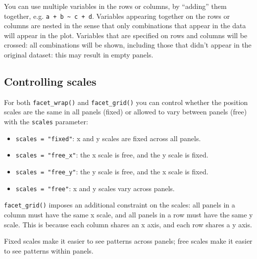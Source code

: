 You can use multiple variables in the rows or columns, by ``adding''
them together, e.g. \texttt{a\ +\ b\ \textasciitilde{}\ c\ +\ d}.
Variables appearing together on the rows or columns are nested in the
sense that only combinations that appear in the data will appear in the
plot. Variables that are specified on rows and columns will be crossed:
all combinations will be shown, including those that didn't appear in
the original dataset: this may result in empty panels.

\hypertarget{sub:controlling-scales}{%
\subsection{Controlling scales}\label{sub:controlling-scales}}

For both \texttt{facet\_wrap()} and \texttt{facet\_grid()} you can
control whether the position scales are the same in all panels (fixed)
or allowed to vary between panels (free) with the \texttt{scales}
parameter: 

\begin{itemize}
\tightlist
\item
  \texttt{scales\ =\ "fixed"}: x and y scales are fixed across all
  panels.
\item
  \texttt{scales\ =\ "free\_x"}: the x scale is free, and the y scale is
  fixed.
\item
  \texttt{scales\ =\ "free\_y"}: the y scale is free, and the x scale is
  fixed.
\item
  \texttt{scales\ =\ "free"}: x and y scales vary across panels.
\end{itemize}

\texttt{facet\_grid()} imposes an additional constraint on the scales:
all panels in a column must have the same x scale, and all panels in a
row must have the same y scale. This is because each column shares an x
axis, and each row shares a y axis.

Fixed scales make it easier to see patterns across panels; free scales
make it easier to see patterns within panels.

\begin{Shaded}
\begin{Highlighting}[]
\StringTok{ }\OperatorTok{+}\StringTok{ }
\StringTok{  }\NormalTok{() }\OperatorTok{+}
\StringTok{  }\NormalTok{(} \NormalTok{, } \NormalTok{) }
\OperatorTok{+}\StringTok{ }\NormalTok{(}\OperatorTok{~}
\end{Highlighting}
\end{Shaded}

